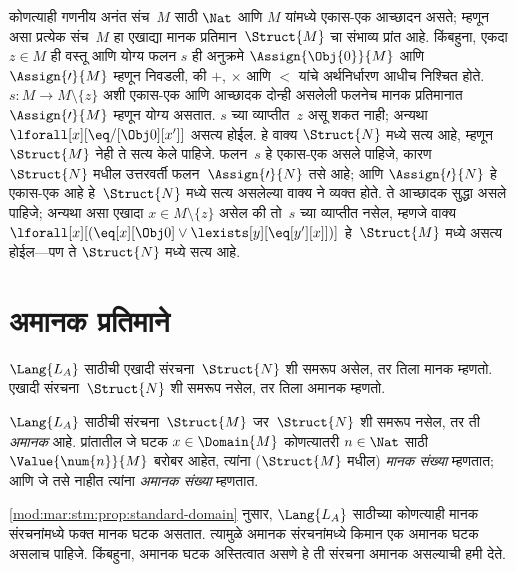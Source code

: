 \begin{explain}
कोणत्याही गणनीय अनंत संच~$M$ साठी $\Nat$ आणि $M$ यांमध्ये
एकास-एक आच्छादन असते; म्हणून असा प्रत्येक संच~$M$ हा एखाद्या मानक
प्रतिमान~$\Struct{M}$ चा संभाव्य प्रांत आहे. किंबहुना, एकदा $z \in M$
ही वस्तू आणि योग्य फलन $s$ ही अनुक्रमे $\Assign{\Obj{0}}{M}$ आणि
$\Assign{\prime}{M}$ म्हणून निवडली, की $+$, $\times$ आणि $<$ यांचे
अर्थनिर्धारण आधीच निश्चित होते. $s\colon M \to M \setminus \{z\}$ अशी
एकास-एक आणि आच्छादक दोन्ही असलेली फलनेच मानक प्रतिमानात
$\Assign{\prime}{M}$ म्हणून योग्य असतात. $s$ च्या व्याप्तीत~$z$ असू शकत
नाही; अन्यथा $\lforall[x][\eq/[\Obj 0][x']]$ असत्य होईल. हे वाक्य
$\Struct{N}$ मध्ये सत्य आहे, म्हणून $\Struct{M}$ नेही ते सत्य केले पाहिजे.
फलन~$s$ हे एकास-एक असले पाहिजे, कारण $\Struct{N}$ मधील उत्तरवर्ती
फलन~$\Assign{\prime}{N}$ तसे आहे; आणि $\Assign{\prime}{N}$ हे
एकास-एक आहे हे~$\Struct{N}$ मध्ये सत्य असलेल्या वाक्य ने
व्यक्त होते. ते आच्छादक सुद्धा असले पाहिजे; अन्यथा असा एखादा
$x \in M \setminus \{z\}$ असेल की तो~$s$ च्या व्याप्तीत नसेल, म्हणजे
वाक्य $\lforall[x][(\eq[x][\Obj 0] \lor
\lexists[y][\eq[y'][x]])]$ हे~$\Struct{M}$ मध्ये असत्य होईल---पण ते
$\Struct{N}$ मध्ये सत्य आहे.

\end{explain}












\section{अमानक प्रतिमाने}\label{mod:mar:nst:sec}

\begin{explain}
$\Lang{L_A}$ साठीची एखादी संरचना~$\Struct{N}$ शी समरूप असेल,
तर तिला मानक म्हणतो. एखादी संरचना~$\Struct{N}$ शी समरूप नसेल,
तर तिला अमानक म्हणतो.
\end{explain}

\begin{defn}
$\Lang{L_A}$ साठीची संरचना~$\Struct{M}$ जर~$\Struct{N}$ शी समरूप
नसेल, तर ती \emph{अमानक} आहे. प्रांतातील जे घटक
$x \in \Domain{M}$ कोणत्यातरी $n \in \Nat$ साठी
$\Value{\num{n}}{M}$ बरोबर आहेत, त्यांना ($\Struct{M}$ मधील)
\emph{मानक संख्या} म्हणतात; आणि जे तसे नाहीत त्यांना \emph{अमानक संख्या}
म्हणतात.
\end{defn}

\begin{explain}
\ref{mod:mar:stm:prop:standard-domain} नुसार, $\Lang{L_A}$ साठीच्या कोणत्याही
मानक संरचनांमध्ये फक्त मानक घटक असतात. त्यामुळे अमानक
संरचनांमध्ये किमान एक अमानक घटक असलाच पाहिजे. किंबहुना, अमानक
घटक अस्तित्वात असणे हे ती संरचना अमानक असल्याची हमी देते.
\end{explain}

